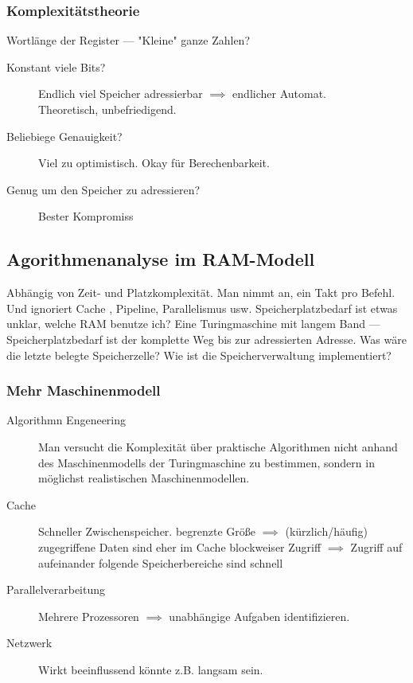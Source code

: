 \documentclass[a4paper]{scrartcl}
\begin{document}
 	\subsubsection{Komplexitätstheorie}
 		Wortlänge der Register --- "Kleine" ganze Zahlen?
 		\begin{description}
 			\item[Konstant viele Bits?] 
 				Endlich viel Speicher adressierbar \( \implies \) endlicher Automat.\\
 				Theoretisch, unbefriedigend.
 			\item[Beliebiege Genauigkeit?] 
 				Viel zu optimistisch. Okay für Berechenbarkeit. 
 			\item[Genug um den Speicher zu adressieren?] 
 				Bester Kompromiss
 		\end{description}
 		\subsection{Agorithmenanalyse im RAM-Modell}
 			Abhängig von Zeit- und Platzkomplexität. Man nimmt an, ein Takt pro Befehl. Und ignoriert Cache , Pipeline, Parallelismus usw.
 			\reversemarginpar {}
 			Speicherplatzbedarf ist etwas unklar, welche RAM benutze ich? Eine Turingmaschine mit langem Band --- Speicherplatzbedarf ist der komplette Weg bis zur adressierten Adresse. Was wäre die letzte belegte Speicherzelle? Wie ist die Speicherverwaltung implementiert?
 			
 			\subsubsection{Mehr Maschinenmodell}
 				\begin{description}
 					\item[Algorithmn Engeneering] 
 						Man versucht die Komplexität über praktische Algorithmen nicht anhand des Maschinenmodells der Turingmaschine zu bestimmen, sondern in möglichst realistischen Maschinenmodellen.
 					\item[Cache] 
 						Schneller Zwischenspeicher.
 						\subitem begrenzte Größe \( \implies \) (kürzlich/häufig) zugegriffene Daten sind eher im Cache
 						\subitem blockweiser Zugriff \( \implies \) Zugriff auf aufeinander folgende Speicherbereiche sind schnell 
 						\reversemarginpar {}
 					\item[Parallelverarbeitung] 
 						Mehrere Prozessoren \( \implies \) unabhängige Aufgaben identifizieren.
 					\item[Netzwerk] 
 						Wirkt beeinflussend könnte z.B. langsam sein.
 				\end{description}
 			
\end{document}

